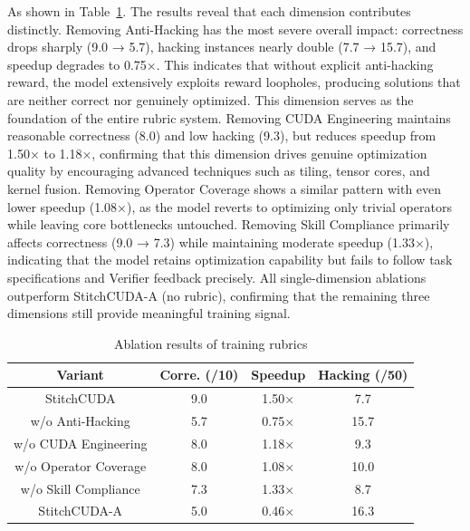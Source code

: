 As shown in Table~\ref{tab:rubric}. The results reveal that each dimension contributes distinctly. Removing Anti-Hacking has the most severe overall impact: correctness drops sharply (9.0 → 5.7), hacking instances nearly double (7.7 → 15.7), and speedup degrades to 0.75×. This indicates that without explicit anti-hacking reward, the model extensively exploits reward loopholes, producing solutions that are neither correct nor genuinely optimized. This dimension serves as the foundation of the entire rubric system. Removing CUDA Engineering maintains reasonable correctness (8.0) and low hacking (9.3), but reduces speedup from 1.50× to 1.18×, confirming that this dimension drives genuine optimization quality by encouraging advanced techniques such as tiling, tensor cores, and kernel fusion. Removing Operator Coverage shows a similar pattern with even lower speedup (1.08×), as the model reverts to optimizing only trivial operators while leaving core bottlenecks untouched. Removing Skill Compliance primarily affects correctness (9.0 → 7.3) while maintaining moderate speedup (1.33×), indicating that the model retains optimization capability but fails to follow task specifications and Verifier feedback precisely. All single-dimension ablations outperform StitchCUDA-A (no rubric), confirming that the remaining three dimensions still provide meaningful training signal.


\begin{table}
    \centering
    \caption{Ablation results of training rubrics}
{\fontsize{8}{8}\selectfont
    \begin{tabular}{|c|c|c|c|}
\hline
\textbf{Variant}      & \textbf{Corre. (/10)} & \textbf{Speedup} & \textbf{Hacking (/50)} \\ \hline
StitchCUDA            & 9.0                        & 1.50×            & 7.7                             \\
w/o Anti-Hacking      & 5.7                        & 0.75×            & 15.7                            \\
w/o CUDA Engineering  & 8.0                        & 1.18×            & 9.3                             \\
w/o Operator Coverage & 8.0                        & 1.08×            & 10.0                            \\
w/o Skill Compliance  & 7.3                        & 1.33×            & 8.7                             \\
StitchCUDA-A          & 5.0                        & 0.46×            & 16.3                            \\ \hline
\end{tabular}}
    \label{tab:rubric}
\end{table}

